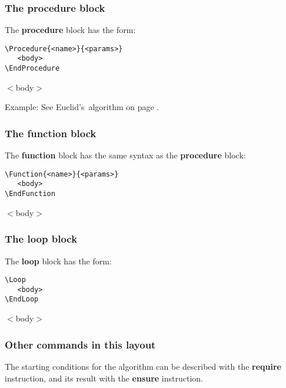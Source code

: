 \documentclass{article}
\newcommand{\euk}{Euclid}
\newcommand\ASTART{\bigskip\noindent\begin{minipage}[b]{0.5\linewidth}}
\newcommand\ACONTINUE{\end{minipage}\begin{minipage}[b]{0.5\linewidth}}
\newcommand\AENDSKIP{\end{minipage}\bigskip}
\newcommand\AEND{\end{minipage}}
\begin{document}
\subsubsection{The \textbf{procedure} block}
The \textbf{procedure} block has the form:

\ASTART
\begin{verbatim}
\Procedure{<name>}{<params>}
   <body>
\EndProcedure
\end{verbatim}
\ACONTINUE
\begin{algorithmic}[1]
   \State $<$body$>$
\EndProcedure
\end{algorithmic}
\AENDSKIP

\noindent Example: See \euk's\ algorithm on page \pageref{euclid}.

\subsubsection{The \textbf{function} block}The 
\textbf{function} block has the same syntax as the \textbf{procedure} block:

\ASTART
\begin{verbatim}
\Function{<name>}{<params>}
   <body>
\EndFunction
\end{verbatim}
\ACONTINUE
\begin{algorithmic}[1]
   \State $<$body$>$
\EndFunction
\end{algorithmic}
\AEND

\subsubsection{The \textbf{loop} block}
The \textbf{loop} block has the form:

\ASTART
\begin{verbatim}
\Loop
   <body>
\EndLoop
\end{verbatim}
\ACONTINUE
\begin{algorithmic}[1]
\Loop
   \State $<$body$>$
\EndLoop
\end{algorithmic}
\AEND

\subsubsection{Other commands in this layout}

The starting conditions for the algorithm can be described with the \textbf{require} 
instruction, and its result with the \textbf{ensure} instruction.
\end{document}

